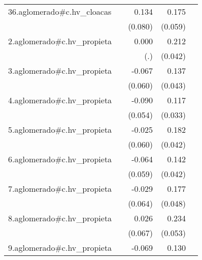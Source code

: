 {\begin{longtable}{l*{4}{D{.}{.}{-1}}}
\addlinespace
36.aglomerado#c.hv\_cloacas&                     &       0.134         &       0.175\sym{**} &                     \\
            &                     &     (0.080)         &     (0.059)         &                     \\
\addlinespace
2.aglomerado#c.hv\_propieta&                     &       0.000         &       0.212\sym{***}&                     \\
            &                     &         (.)         &     (0.042)         &                     \\
\addlinespace
3.aglomerado#c.hv\_propieta&                     &      -0.067         &       0.137\sym{**} &                     \\
            &                     &     (0.060)         &     (0.043)         &                     \\
\addlinespace
4.aglomerado#c.hv\_propieta&                     &      -0.090         &       0.117\sym{***}&                     \\
            &                     &     (0.054)         &     (0.033)         &                     \\
\addlinespace
5.aglomerado#c.hv\_propieta&                     &      -0.025         &       0.182\sym{***}&                     \\
            &                     &     (0.060)         &     (0.042)         &                     \\
\addlinespace
6.aglomerado#c.hv\_propieta&                     &      -0.064         &       0.142\sym{***}&                     \\
            &                     &     (0.059)         &     (0.042)         &                     \\
\addlinespace
7.aglomerado#c.hv\_propieta&                     &      -0.029         &       0.177\sym{***}&                     \\
            &                     &     (0.064)         &     (0.048)         &                     \\
\addlinespace
8.aglomerado#c.hv\_propieta&                     &       0.026         &       0.234\sym{***}&                     \\
            &                     &     (0.067)         &     (0.053)         &                     \\
\addlinespace
9.aglomerado#c.hv\_propieta&                     &      -0.069         &       0.130\sym{**} &                     \\

\end{longtable}}
